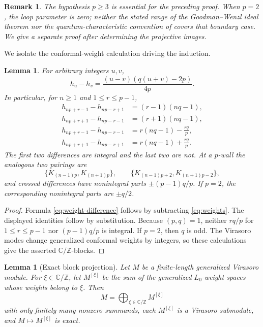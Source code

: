 \documentclass[12pt,leqno]{amsart}
\numberwithin{equation}{section}
\newtheorem{lem}[thm]{Lemma}
\newtheorem{rmk}[thm]{Remark}
\def\Z{\mathbb{Z}}
\def\C{\mathbb{C}}
\begin{document}
\begin{rmk}\label{rmk:TL-p-ge-3}
The hypothesis $p\geq3$ is essential for the preceding proof.  When
$p=2$, the loop parameter is zero; neither the stated range of the
Goodman--Wenzl ideal theorem nor the quantum-characteristic convention of
\cite{SuttonTubbenhauerWedrichZhu} covers that boundary case.  We give a
separate proof after determining the projective images.
\end{rmk}

We isolate the conformal-weight calculation driving the induction.

\begin{lem}\label{lem:weight-arithmetic}
For arbitrary integers $u,v$,
\begin{equation}\label{eq:weight-difference}
 h_u-h_v=\frac{(u-v)(q(u+v)-2p)}{4p}.
\end{equation}
In particular, for $n\geq1$ and $1\leq r\leq p-1$,
\begin{align}
 h_{np+r-1}-h_{np-r+1}&=(r-1)(nq-1),\label{eq:parallel-one}\\
 h_{np+r+1}-h_{np-r-1}&=(r+1)(nq-1),\label{eq:parallel-two}\\
 h_{np+r-1}-h_{np-r-1}&=r(nq-1)-\frac{rq}{p},\label{eq:cross-one}\\
 h_{np+r+1}-h_{np-r+1}&=r(nq-1)+\frac{rq}{p}.\label{eq:cross-two}
\end{align}
The first two differences are integral and the last two are not.  At a
$p$-wall the analogous two pairings are
\[
 \{K_{(n-1)p},K_{(n+1)p}\},\qquad
 \{K_{(n-1)p+2},K_{(n+1)p-2}\},
\]
and crossed differences have nonintegral parts
$\pm(p-1)q/p$.  If $p=2$, the corresponding nonintegral parts are
$\pm q/2$.
\end{lem}

\begin{proof}
Formula \eqref{eq:weight-difference} follows by subtracting
\eqref{eq:weights}.  The displayed identities follow by substitution.
Because $(p,q)=1$, neither $rq/p$ for $1\leq r\leq p-1$ nor
$(p-1)q/p$ is integral.  If $p=2$, then $q$ is odd.  The Virasoro modes
change generalized conformal weights by integers, so these calculations
give the asserted $\C/\Z$-blocks.
\end{proof}

\begin{lem}[Exact block projection]\label{lem:block-projection}
Let $M$ be a finite-length generalized Virasoro module.  For
$\xi\in\C/\Z$, let $M^{[\xi]}$ be the sum of the generalized $L_0$-weight
spaces whose weights belong to $\xi$.  Then
\[
 M=\bigoplus_{\xi\in\C/\Z}M^{[\xi]}
\]
with only finitely many nonzero summands, each $M^{[\xi]}$ is a Virasoro
submodule, and $M\mapsto M^{[\xi]}$ is exact.
\end{lem}
\end{document}
